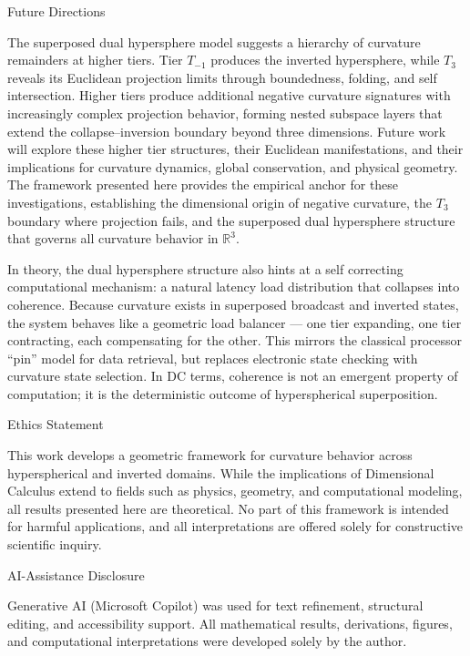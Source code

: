 \documentclass[final,onefignum,onetabnum]{siamart}
\begin{document}
\begin{section}{Future Directions}

The superposed dual hypersphere model suggests a hierarchy of curvature remainders at higher tiers. Tier $T_{-1}$ produces the inverted hypersphere, while $T_3$ reveals its Euclidean projection limits through boundedness, folding, and self intersection. Higher tiers produce additional negative curvature signatures with increasingly complex projection behavior, forming nested subspace layers that extend the collapse–inversion boundary beyond three dimensions. Future work will explore these higher tier structures, their Euclidean manifestations, and their implications for curvature dynamics, global conservation, and physical geometry. The framework presented here provides the empirical anchor for these investigations, establishing the dimensional origin of negative curvature, the $T_3$ boundary where projection fails, and the superposed dual hypersphere structure that governs all curvature behavior in $\mathbb{R}^3.$

In theory, the dual hypersphere structure also hints at a self correcting computational mechanism: a natural latency load distribution that collapses into coherence. Because curvature exists in superposed broadcast and inverted states, the system behaves like a geometric load balancer — one tier expanding, one tier contracting, each compensating for the other. This mirrors the classical processor “pin” model for data retrieval, but replaces electronic state checking with curvature state selection. In DC terms, coherence is not an emergent property of computation; it is the deterministic outcome of hyperspherical superposition.
\end{section}

\begin{section}{Ethics Statement}

This work develops a geometric framework for curvature behavior across hyperspherical and inverted domains. While the implications of Dimensional Calculus extend to fields such as physics, geometry, and computational modeling, all results presented here are theoretical. No part of this framework is intended for harmful applications, and all interpretations are offered solely for constructive scientific inquiry.
\end{section}

\begin{section}{AI-Assistance Disclosure}

Generative AI (Microsoft Copilot) was used for text refinement, structural editing, and accessibility support. All mathematical results, derivations, figures, and computational interpretations were developed solely by the author.
\end{section}
\end{document}
